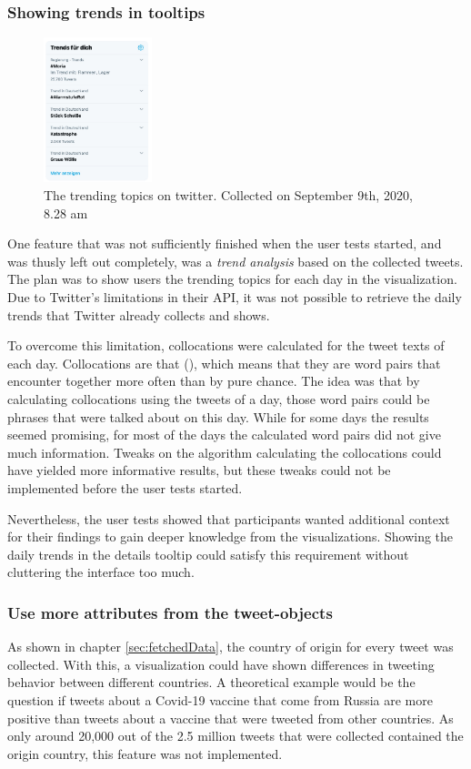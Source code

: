 \subsubsection*{Showing trends in tooltips}
\begin{figure}
    \includegraphics[width=0.28\textwidth]{images/twitter_trends.jpg}
    \caption{The trending topics on twitter. Collected on September 9th, 2020, 8.28 am}
    \label{fig:twitter_trends}
\end{figure}
One feature that was not sufficiently finished when the user tests started, and was thusly left out completely, was a \emph{trend analysis} based on the collected tweets. The plan was to show users the trending topics for each day in the visualization. Due to Twitter's limitations in their API, it was not possible to retrieve the daily trends that Twitter already collects and shows.

To overcome this limitation, collocations were calculated for the tweet texts of each day. Collocations are  that  (\cite[2]{mckeown2000collocations}), which means that they are word pairs that encounter together more often than by pure chance. The idea was that by calculating collocations using the tweets of a day, those word pairs could be phrases that were talked about on this day. While for some days the results seemed promising, for most of the days the calculated word pairs did not give much information. Tweaks on the algorithm calculating the collocations could have yielded more informative results, but these tweaks could not be implemented before the user tests started.

Nevertheless, the user tests showed that participants wanted additional context for their findings to gain deeper knowledge from the visualizations. Showing the daily trends in the details tooltip could satisfy this requirement without cluttering the interface too much.

\subsubsection*{Use more attributes from the tweet-objects}
As shown in chapter \ref{sec:fetchedData}, the country of origin for every tweet was collected. With this, a visualization could have shown differences in tweeting behavior between different countries. A theoretical example would be the question if tweets about a Covid-19 vaccine that come from Russia are more positive than tweets about a vaccine that were tweeted from other countries. As only around 20,000 out of the 2.5 million tweets that were collected contained the origin country, this feature was not implemented.

